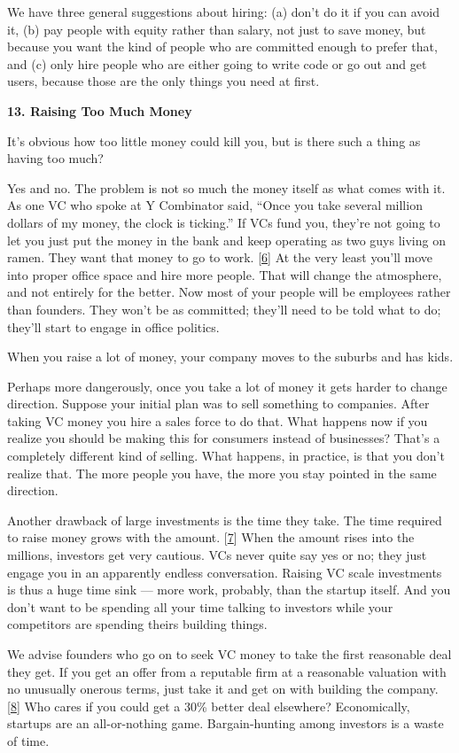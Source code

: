 We have three general suggestions about hiring: (a) don't do it if you
can avoid it, (b) pay people with equity rather than salary, not just to
save money, but because you want the kind of people who are committed
enough to prefer that, and (c) only hire people who are either going to
write code or go out and get users, because those are the only things
you need at first.

\textbf{13. Raising Too Much Money}

It's obvious how too little money could kill you, but is there such a
thing as having too much?

Yes and no. The problem is not so much the money itself as what comes
with it. As one VC who spoke at Y Combinator said, ``Once you take
several million dollars of my money, the clock is ticking.'' If VCs fund
you, they're not going to let you just put the money in the bank and
keep operating as two guys living on ramen. They want that money to go
to work. {[}\hyperref[f6n]{6}{]} At the very least you'll move into
proper office space and hire more people. That will change the
atmosphere, and not entirely for the better. Now most of your people
will be employees rather than founders. They won't be as committed;
they'll need to be told what to do; they'll start to engage in office
politics.

When you raise a lot of money, your company moves to the suburbs and has
kids.

Perhaps more dangerously, once you take a lot of money it gets harder to
change direction. Suppose your initial plan was to sell something to
companies. After taking VC money you hire a sales force to do that. What
happens now if you realize you should be making this for consumers
instead of businesses? That's a completely different kind of selling.
What happens, in practice, is that you don't realize that. The more
people you have, the more you stay pointed in the same direction.

Another drawback of large investments is the time they take. The time
required to raise money grows with the amount. {[}\hyperref[f7n]{7}{]}
When the amount rises into the millions, investors get very cautious.
VCs never quite say yes or no; they just engage you in an apparently
endless conversation. Raising VC scale investments is thus a huge time
sink --- more work, probably, than the startup itself. And you don't
want to be spending all your time talking to investors while your
competitors are spending theirs building things.

We advise founders who go on to seek VC money to take the first
reasonable deal they get. If you get an offer from a reputable firm at a
reasonable valuation with no unusually onerous terms, just take it and
get on with building the company. {[}\hyperref[f8n]{8}{]} Who cares if
you could get a 30\% better deal elsewhere? Economically, startups are
an all-or-nothing game. Bargain-hunting among investors is a waste of
time.

